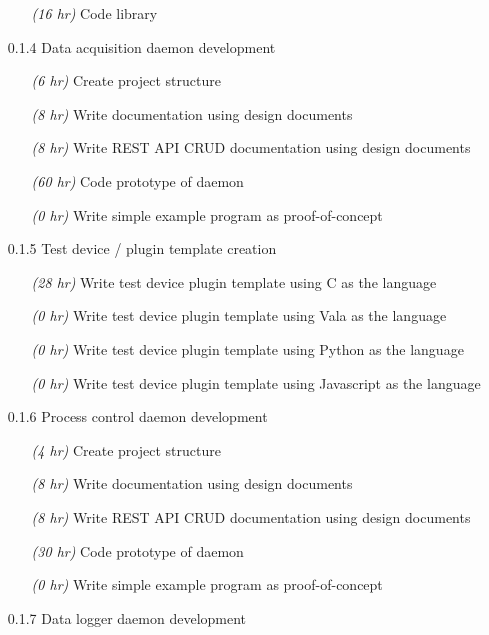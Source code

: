 \begin{itemize}
\begin{itemize}
          \item[\emph{(16 hr)}] Code library
        \end{itemize}
      \item[0.1.4] Data acquisition daemon development
        \begin{itemize}
          \item[\emph{(6 hr)}] Create project structure
          \item[\emph{(8 hr)}] Write documentation using design documents
          \item[\emph{(8 hr)}] Write REST API CRUD documentation using design documents
          \item[\emph{(60 hr)}] Code prototype of daemon
          \item[\emph{(0 hr)}] Write simple example program as proof-of-concept
        \end{itemize}
      \item[0.1.5] Test device / plugin template creation
        \begin{itemize}
          \item[\emph{(28 hr)}] Write test device plugin template using C as the language
          \item[\emph{(0 hr)}] Write test device plugin template using Vala as the language
          \item[\emph{(0 hr)}] Write test device plugin template using Python as the language
          \item[\emph{(0 hr)}] Write test device plugin template using Javascript as the language
        \end{itemize}
      \item[0.1.6] Process control daemon development
        \begin{itemize}
          \item[\emph{(4 hr)}] Create project structure
          \item[\emph{(8 hr)}] Write documentation using design documents
          \item[\emph{(8 hr)}] Write REST API CRUD documentation using design documents
          \item[\emph{(30 hr)}] Code prototype of daemon
          \item[\emph{(0 hr)}] Write simple example program as proof-of-concept
        \end{itemize}
      \item[0.1.7] Data logger daemon development
        \begin{itemize}

\end{itemize}
\end{itemize}
